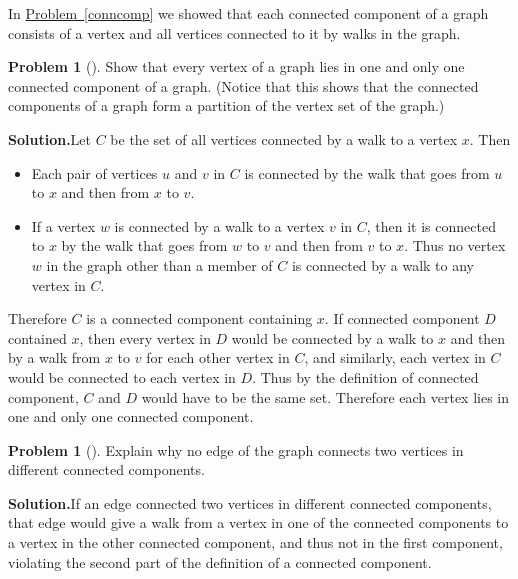 \documentclass[10pt,]{book}
\theoremstyle{plain}
\theoremstyle{definition}
\newtheorem{activity}[project]{Problem}
\theoremstyle{definition}
\numberwithin{equation}{chapter}
\begin{document}
%
\par
In \hyperref[conncomp]{Problem~\ref{conncomp}} we showed that each connected component of a graph consists of a vertex and all vertices connected to it by walks in the graph.%
\begin{activity}[]\label{activity-418}
Show that every vertex of a graph lies in one and only one connected component of a graph. (Notice that this shows that the connected components of a graph form a partition of the vertex set of the graph.)%
\par\medskip\noindent%
\textbf{Solution.}\quad Let \(C\) be the set of all vertices connected by a walk to a vertex \(x\). Then \leavevmode%
\begin{itemize}[label=\textbullet]
\item{}Each pair of vertices \(u\) and \(v\) in \(C\) is connected by the walk that goes from \(u\) to \(x\) and then from \(x\) to \(v\).%
\item{}If a vertex \(w\) is connected by a walk to a vertex \(v\) in \(C\), then it is connected to \(x\) by the walk that goes from \(w\) to \(v\) and then from \(v\) to \(x\).  Thus no  vertex \(w\) in the graph other than a member of \(C\) is connected by a walk to any vertex in \(C\).%
\end{itemize}
%
\par
Therefore \(C\) is a connected component containing \(x\). If connected component \(D\) contained \(x\), then every vertex in \(D\) would be connected by a walk to \(x\) and then by a walk from \(x\) to \(v\) for each other vertex in \(C\), and similarly, each vertex in \(C\) would be connected to each vertex in \(D\). Thus by the definition of connected component, \(C\) and \(D\) would have to be the same set. Therefore each vertex lies in one and only one connected component.%
\end{activity}
\begin{activity}[]\label{activity-419}
Explain why no edge of the graph connects two vertices in different connected components.%
\par\medskip\noindent%
\textbf{Solution.}\quad If an edge connected two vertices in different connected components, that edge would give a walk from a vertex in one of the connected components to a vertex in the other connected component, and thus not in the first component, violating the second part of the definition of a connected component.%
\end{activity}
\end{document}
